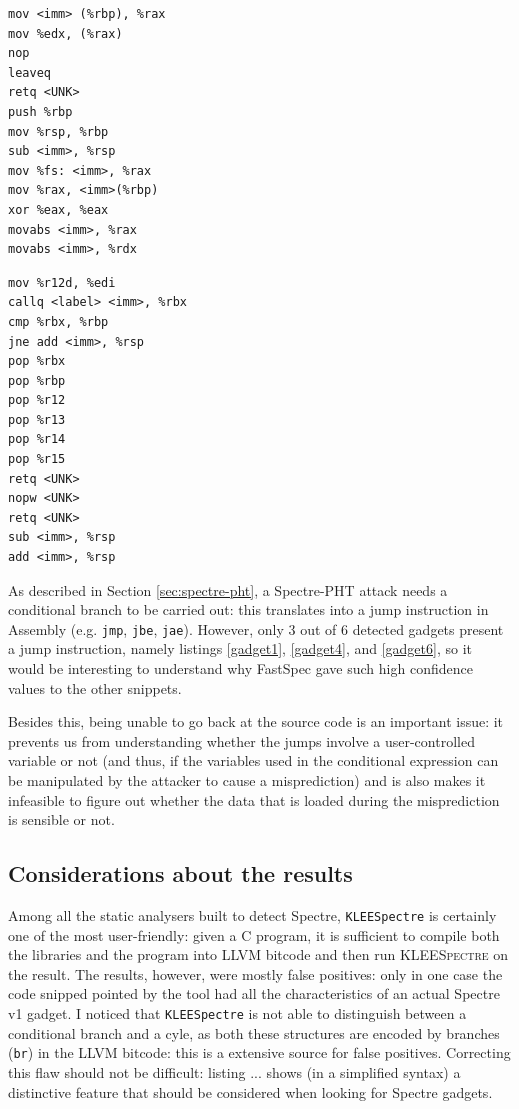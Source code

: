 \documentclass[12pt,a4paper]{book}
\theoremstyle{definition}
\begin{document}
	\begin{minipage}{.45\textwidth}
	\begin{lstlisting}[caption={Window 11598-11601}, label=gadget5]
mov <imm> (%rbp), %rax
mov %edx, (%rax)
nop
leaveq
retq <UNK>
push %rbp
mov %rsp, %rbp
sub <imm>, %rsp
mov %fs: <imm>, %rax
mov %rax, <imm>(%rbp)
xor %eax, %eax
movabs <imm>, %rax
movabs <imm>, %rdx
	\end{lstlisting}
\end{minipage}\hfill
\begin{minipage}{.45\textwidth}
	\begin{lstlisting}[caption={Window 11868-11902}, label=gadget6]
mov %r12d, %edi
callq <label> <imm>, %rbx
cmp %rbx, %rbp
jne add <imm>, %rsp
pop %rbx
pop %rbp
pop %r12
pop %r13
pop %r14
pop %r15
retq <UNK>
nopw <UNK>
retq <UNK>
sub <imm>, %rsp
add <imm>, %rsp
	\end{lstlisting}
\end{minipage}
	\vspace{3mm}
	
	As described in Section \ref{sec:spectre-pht}, a Spectre-PHT attack needs a conditional branch to be carried out: this translates into a jump instruction in Assembly (e.g. \texttt{jmp}, \texttt{jbe}, \texttt{jae}). However, only 3 out of 6 detected gadgets present a jump instruction, namely listings \ref{gadget1}, \ref{gadget4}, and \ref{gadget6}, so it would be interesting to understand why FastSpec gave such high confidence values to the other snippets. 
	
	Besides this, being unable to go back at the source code is an important issue: it prevents us from understanding whether the jumps involve a user-controlled variable or not (and thus, if the variables used in the conditional expression can be manipulated by the attacker to cause a misprediction) and is also makes it infeasible to figure out whether the data that is loaded during the misprediction is sensible or not. 
	
	\subsection{Considerations about the results}\label{sec:final}
	Among all the static analysers built to detect Spectre, \texttt{KLEESpectre} is certainly one of the most user-friendly: given a C program, it is sufficient to compile both the libraries and the program into LLVM bitcode and then run \textsc{KLEESpectre} on the result. The results, however, were mostly false positives: only in one case the code snipped pointed by the tool had all the characteristics of an actual Spectre v1 gadget. I noticed that \texttt{KLEESpectre} is not able to distinguish between a conditional branch and a cyle, as both these structures are encoded by branches (\texttt{br}) in the LLVM bitcode: this is a extensive source for false positives. Correcting this flaw should not be difficult: listing ... shows (in a simplified syntax) a distinctive feature that should be considered when looking for Spectre gadgets.
	
\end{document}
